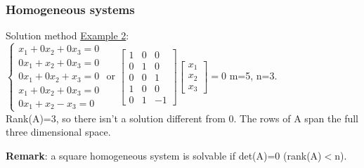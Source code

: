 \begin{frame}
	\frametitle{Homogeneous systems}
	\begin{block}{Solution method}
		\underline{Example 2}:\\
		$\begin{cases}
		x_1+0x_2+0x_3=0\\
		0x_1+x_2+0x_3=0\\
		0x_1+0x_2+x_3=0\\
		x_1+0x_2+0x_3=0\\
		0x_1+x_2-x_3=0
		\end{cases}$ or $\begin{bmatrix}
		1 & 0 & 0\\
		0 & 1 & 0\\
		0 & 0 & 1\\
		1 & 0 & 0\\
		0 & 1 & -1
		\end{bmatrix} \begin{bmatrix}
		x_1\\x_2\\x_3
		\end{bmatrix}=0$ \hspace{0.4cm} m=5, n=3.\\
		Rank(A)=3, so there isn't a solution different from 0. The rows of A span the full three dimensional space. \vspace{4mm}
		
		\textbf{Remark}: a square homogeneous system is solvable if det(A)=0 (rank(A)$<$n).
	\end{block}
\end{frame}

